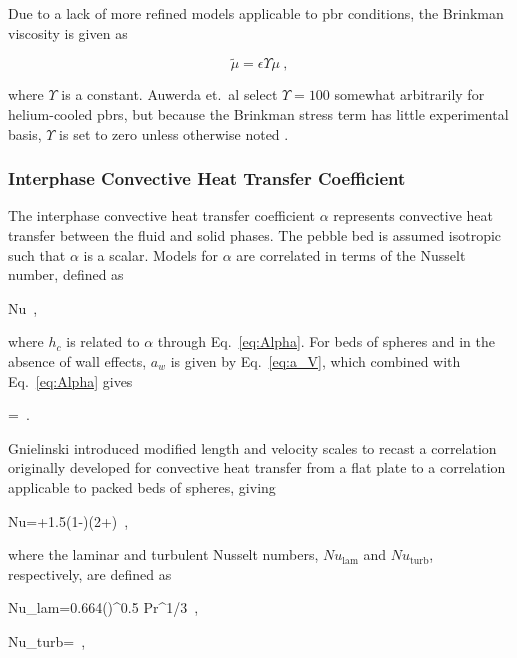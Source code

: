 Due to a lack of more refined models applicable to \gls{pbr} conditions, the Brinkman viscosity is given as

\begin{equation}
\label{eq:MultiplierEffectiveViscosity}
\tilde{\mu}=\epsilon\Upsilon\mu\ ,
\end{equation}

\noindent where \(\Upsilon\) is a constant. Auwerda et.\ al select \(\Upsilon=100\) somewhat arbitrarily for helium-cooled \glspl{pbr}, but because the Brinkman stress term has little experimental basis, \(\Upsilon\) is set to zero unless otherwise noted \cite{auwerda_2011}.

\subsubsection{Interphase Convective Heat Transfer Coefficient}
\label{sec:alpha}

The interphase convective heat transfer coefficient \(\alpha\) represents convective heat transfer between the fluid and solid phases. The pebble bed is assumed isotropic such that \(\alpha\) is a scalar. Models for \(\alpha\) are correlated in terms of the Nusselt number, defined as

\beq
\label{eq:NuDef}
Nu\equiv{}\ ,
\eeq

\noindent where \(h_c\) is related to \(\alpha\) through Eq.\ \eqref{eq:Alpha}. For beds of spheres and in the absence of wall effects, \(a_w\) is given by Eq.\ \eqref{eq:a_V}, which combined with Eq.\ \eqref{eq:Alpha} gives

\beq
\alpha=\ .
\eeq

\noindent Gnielinski introduced modified length and velocity scales to recast a correlation originally developed for convective heat transfer from a flat plate to a correlation applicable to packed beds of spheres, giving

\beq
\label{eq:GnielinskiPebblebed}
Nu=\left{}+1.5(1-\epsilon)\right\rbrack\left(2+\right)\ ,
\eeq

\noindent where the laminar and turbulent Nusselt numbers, \(Nu_\text{lam}\) and \(Nu_\text{turb}\), respectively, are defined as

\beq
\label{eq:NuLam}
Nu_{\textrm{lam}}=0.664\left(\right)^{0.5} Pr^{1/3}\ ,
\eeq

\beq
\label{eq:NuTurb}
Nu_{\textrm{turb}}=\ ,
\eeq

